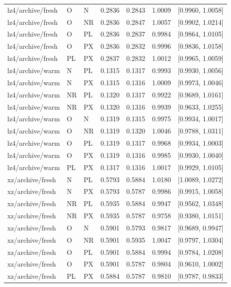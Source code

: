 \begin{longtable}{lllrrrr}
lz4/archive/fresh & O & N & 0.2836 & 0.2843 & 1.0009 & [0.9960, 1.0058] \\
lz4/archive/fresh & O & NR & 0.2836 & 0.2847 & 1.0057 & [0.9902, 1.0214] \\
lz4/archive/fresh & O & PL & 0.2836 & 0.2837 & 0.9984 & [0.9864, 1.0105] \\
lz4/archive/fresh & O & PX & 0.2836 & 0.2832 & 0.9996 & [0.9836, 1.0158] \\
lz4/archive/fresh & PL & PX & 0.2837 & 0.2832 & 1.0012 & [0.9965, 1.0059] \\
lz4/archive/warm & N & PL & 0.1315 & 0.1317 & 0.9993 & [0.9930, 1.0056] \\
lz4/archive/warm & N & PX & 0.1315 & 0.1316 & 1.0009 & [0.9973, 1.0046] \\
lz4/archive/warm & NR & PL & 0.1320 & 0.1317 & 0.9922 & [0.9689, 1.0161] \\
lz4/archive/warm & NR & PX & 0.1320 & 0.1316 & 0.9939 & [0.9633, 1.0255] \\
lz4/archive/warm & O & N & 0.1319 & 0.1315 & 0.9975 & [0.9934, 1.0017] \\
lz4/archive/warm & O & NR & 0.1319 & 0.1320 & 1.0046 & [0.9788, 1.0311] \\
lz4/archive/warm & O & PL & 0.1319 & 0.1317 & 0.9968 & [0.9934, 1.0003] \\
lz4/archive/warm & O & PX & 0.1319 & 0.1316 & 0.9985 & [0.9930, 1.0040] \\
lz4/archive/warm & PL & PX & 0.1317 & 0.1316 & 1.0017 & [0.9929, 1.0105] \\
xz/archive/fresh & N & PL & 0.5793 & 0.5884 & 1.0180 & [1.0089, 1.0272] \\
xz/archive/fresh & N & PX & 0.5793 & 0.5787 & 0.9986 & [0.9915, 1.0058] \\
xz/archive/fresh & NR & PL & 0.5935 & 0.5884 & 0.9947 & [0.9562, 1.0348] \\
xz/archive/fresh & NR & PX & 0.5935 & 0.5787 & 0.9758 & [0.9380, 1.0151] \\
xz/archive/fresh & O & N & 0.5901 & 0.5793 & 0.9817 & [0.9689, 0.9947] \\
xz/archive/fresh & O & NR & 0.5901 & 0.5935 & 1.0047 & [0.9797, 1.0304] \\
xz/archive/fresh & O & PL & 0.5901 & 0.5884 & 0.9994 & [0.9784, 1.0208] \\
xz/archive/fresh & O & PX & 0.5901 & 0.5787 & 0.9804 & [0.9610, 1.0002] \\
xz/archive/fresh & PL & PX & 0.5884 & 0.5787 & 0.9810 & [0.9787, 0.9833] \\

\end{longtable}
